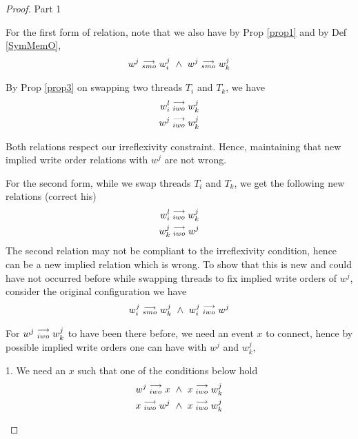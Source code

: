 \begin{proof}{Part 1}
\begin{itemize}
                        For the first form of relation, note that we also have by Prop \ref{prop1} and by Def \ref{SymMemO}, 
                        \begin{align*}
                            \reln{w^j}{smo}{w_i^j} \ \wedge \ \reln{w^j}{smo}{w_k^j}
                        \end{align*}

                        By Prop \ref{prop3} on swapping two threads $T_i$ and $T_k$, we have 
                        \begin{align*}
                            w_i^l\stackrel{\longrightarrow}{_{iwo}}w_k^j \\
                            w^j\stackrel{\longrightarrow}{_{iwo}}w_k^j
                        \end{align*}

                        Both relations respect our irreflexivity constraint.  Hence, maintaining that new implied write order relations with $w^j$ are not wrong.

                        For the second form, while we swap threads $T_i$ and $T_k$, we get the following new relations (correct his)
                        \begin{align*}
                            w_i^l\stackrel{\longrightarrow}{_{iwo}}w_k^j \\
                            w_k^j\stackrel{\longrightarrow}{_{iwo}}w^j
                        \end{align*}
                        The second relation may not be compliant to the irreflexivity condition, hence can be a new implied relation which  is   wrong. To show that this is new and could have not occurred before while swapping threads to fix implied write  orders of  $w^j$, consider the original configuration we have 
                        \begin{align*}
                            \reln{w_i^j}{smo}{w_k^j} \ \wedge \ \reln{w_i^j}{iwo}{w^j}
                        \end{align*}

                        For $w^j\stackrel{\longrightarrow}{_{iwo}}w_k^j$ to have been there before, we need an event $x$ to connect, hence by possible implied write orders one can have with $w^j$ and $w_k^j$, 
                        
                        1. We need an $x$ such that one of the conditions below hold
                        \begin{align*}
                            \reln{w^j}{iwo}{x} \ \wedge \ \reln{x}{iwo}{w_k^j} \\ 
                            \reln{x}{iwo}{w^j} \ \wedge \ \reln{x}{iwo}{w_k^j}
                        \end{align*}


\end{itemize}
\end{proof}
